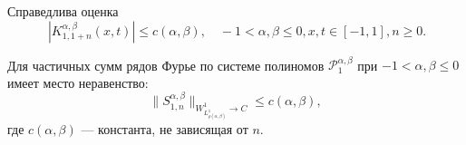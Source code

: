\begin{lemma}\label{mmg-st-K1n-bounded}
	Справедлива оценка
	\begin{equation}\
		|K^{\alpha,\beta}_{1,1+n}(x,t)| \le c(\alpha, \beta), \quad -1 < \alpha, \beta \le 0, x,t \in [-1,1], n \ge 0.
	\end{equation}
\end{lemma}
\begin{theorem}\label{mmg-st-S1n-norm-est}
	Для частичных сумм рядов Фурье по системе полиномов $\mathcal{P}_1^{\alpha,\beta}$ при $-1< \alpha, \beta \le 0$ имеет место неравенство:
	\begin{equation}\label{mmg-S1n-bound}
		\|S^{\alpha,\beta}_{1,n}\|_{W^1_{L^1_{\rho(\alpha,\beta)}} \to C} \le c(\alpha,\beta),
	\end{equation}
	где $c(\alpha,\beta)$ --- константа, не зависящая от $n$.
\end{theorem}









